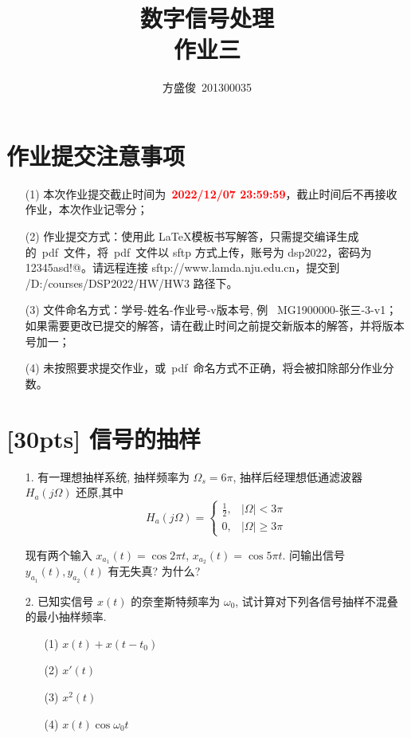 \documentclass[a4paper,UTF8]{article}
\numberwithin{equation}{section}
\begin{document}
	
	\title{数字信号处理\\
		作业三}
	\author{方盛俊\, 201300035} 
	\maketitle
	
	\section*{作业提交注意事项}
	\begin{tcolorbox}
		\begin{enumerate}
			\item[(1)] 本次作业提交截止时间为~\textcolor{red}{\textbf{2022/12/07  23:59:59}}，截止时间后不再接收作业，本次作业记零分；
			\item[(2)] 作业提交方式：使用此 \LaTeX 模板书写解答，只需提交编译生成的~pdf~文件，将~pdf~文件以 sftp 方式上传，账号为 dsp2022，密码为 12345asd!@。请远程连接 sftp://www.lamda.nju.edu.cn，提交到 /D:/courses/DSP2022/HW/HW3 路径下。
			\item[(3)] 文件命名方式：学号-姓名-作业号-v版本号, 例~ MG1900000-张三-3-v1；如果需要更改已提交的解答，请在截止时间之前提交新版本的解答，并将版本号加一；
			\item[(4)] 未按照要求提交作业，或~pdf~命名方式不正确，将会被扣除部分作业分数。
			
		\end{enumerate}
	\end{tcolorbox}
	
	
	\newpage
	\section{[30pts] 信号的抽样}
	\begin{itemize}
		\item[1.]有一理想抽样系统, 抽样频率为 $\Omega_{s}=6 \pi$, 抽样后经理想低通滤波器 $H_a({j} \Omega)$ 还原,其中
		$$
		H_a({j} \Omega)= \begin{cases}\frac{1}{2}, & |\Omega|<3 \pi \\ 0, & |\Omega| \geqslant 3 \pi\end{cases}
		$$
		
		现有两个输入 $x_{a_1}(t)=\cos 2 \pi t$, $x_{a_2}(t)=\cos 5 \pi t$. 问输出信号 $y_{a_1}(t), y_{a_2}(t)$ 有无失真? 为什么?
		\item[2.] 已知实信号 $x(t)$ 的奈奎斯特频率为 $\omega_0$, 试计算对下列各信号抽样不混叠的最小抽样频率.
		\begin{itemize}
			\item[(1)]$ x(t)+x(t-t_0) $
			\item[(2)]$ x'(t) $
			\item[(3)]$ x^2(t) $
			\item[(4)]$ x(t)\cos \omega_0 t $
		\end{itemize}
	\end{itemize}
	
\end{document}

